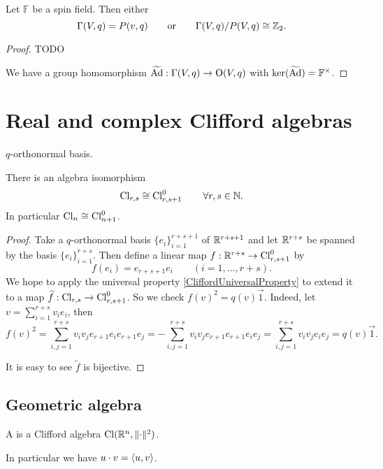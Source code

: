 \begin{proposition}
Let $\mathbb{F}$ be a spin field. Then either
\[ \Gamma(V,q)=P(v,q) \qquad \text{or} \qquad \Gamma(V,q)/P(V,q) \cong \mathbb{Z}_2. \]
\end{proposition}
\begin{proof}
TODO

We have a group homomorphism $\widetilde{\operatorname{Ad}}: \Gamma(V,q)\to \operatorname{O}(V,q)$ with $\ker(\widetilde{\operatorname{Ad}}) = \mathbb{F}^\times$. 
\end{proof}

\section{Real and complex Clifford algebras}

\begin{definition}
$q$-orthonormal basis.
\end{definition}

\begin{proposition}
There is an algebra isomorphism
\[ \operatorname{Cl}_{r,s} \cong \operatorname{Cl}^0_{r,s+1} \qquad \forall r,s\in\mathbb{N}. \]
In particular $\operatorname{Cl}_n \cong \operatorname{Cl}^0_{n+1}$.
\end{proposition}
\begin{proof}
Take a $q$-orthonormal basis $\{e_i\}_{i=1}^{r+s+1}$ of $\mathbb{R}^{r+s+1}$ and let $\mathbb{R}^{r+s}$ be spanned by the basis $\{e_i\}_{i=1}^{r+s}$. Then define a linear map $f:\mathbb{R}^{r+s}\to \operatorname{Cl}^0_{r,s+1}$ by
\[ f(e_i) = e_{r+s+1}e_i \qquad (i=1,\ldots,r+s). \]
We hope to apply the universal property \ref{CliffordUniversalProperty} to extend it to a map $\widetilde{f}: \operatorname{Cl}_{r,s}\to \operatorname{Cl}^0_{r,s+1}$. So we check $f(v)^2 = q(v) \vec{1}$. Indeed, let $v = \sum_{i=1}^{r+s}v_ie_i$, then
\[ f(v)^2 = \sum_{i,j=1}^{r+s}v_iv_je_{r+1}e_ie_{r+1}e_j = -\sum_{i,j=1}^{r+s}v_iv_je_{r+1}e_{r+1}e_ie_j = \sum_{i,j=1}^{r+s}v_iv_je_ie_j = q(v) \vec{1}. \]

It is easy to see $\widetilde{f}$ is bijective.
\end{proof}


\subsection{Geometric algebra}
\begin{definition}
A  is a Clifford algebra $\operatorname{Cl}(\mathbb{R}^n, \lVert\cdot\rVert^2)$.
\end{definition}

In particular we have $u\cdot v = \left\langle u,v \right\rangle$.

